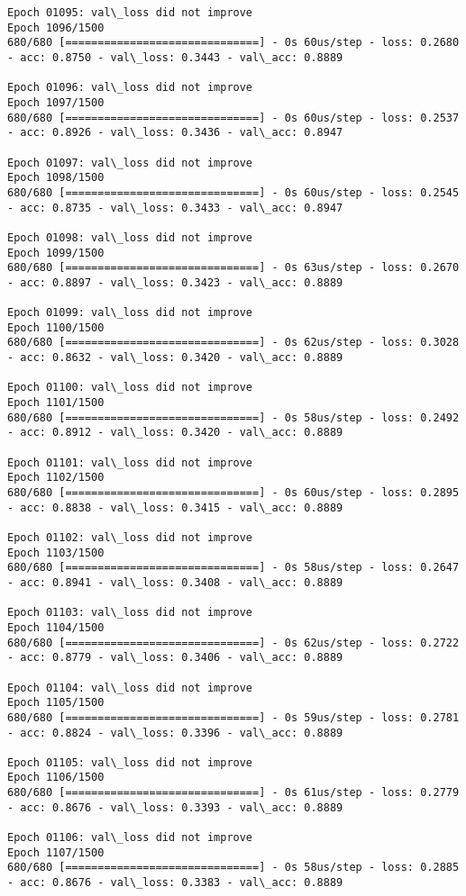 \documentclass[11pt]{article}
\begin{document}
\begin{Verbatim}[commandchars=\\\{\}]
Epoch 01095: val\_loss did not improve
Epoch 1096/1500
680/680 [==============================] - 0s 60us/step - loss: 0.2680 - acc: 0.8750 - val\_loss: 0.3443 - val\_acc: 0.8889

Epoch 01096: val\_loss did not improve
Epoch 1097/1500
680/680 [==============================] - 0s 60us/step - loss: 0.2537 - acc: 0.8926 - val\_loss: 0.3436 - val\_acc: 0.8947

Epoch 01097: val\_loss did not improve
Epoch 1098/1500
680/680 [==============================] - 0s 60us/step - loss: 0.2545 - acc: 0.8735 - val\_loss: 0.3433 - val\_acc: 0.8947

Epoch 01098: val\_loss did not improve
Epoch 1099/1500
680/680 [==============================] - 0s 63us/step - loss: 0.2670 - acc: 0.8897 - val\_loss: 0.3423 - val\_acc: 0.8889

Epoch 01099: val\_loss did not improve
Epoch 1100/1500
680/680 [==============================] - 0s 62us/step - loss: 0.3028 - acc: 0.8632 - val\_loss: 0.3420 - val\_acc: 0.8889

Epoch 01100: val\_loss did not improve
Epoch 1101/1500
680/680 [==============================] - 0s 58us/step - loss: 0.2492 - acc: 0.8912 - val\_loss: 0.3420 - val\_acc: 0.8889

Epoch 01101: val\_loss did not improve
Epoch 1102/1500
680/680 [==============================] - 0s 60us/step - loss: 0.2895 - acc: 0.8838 - val\_loss: 0.3415 - val\_acc: 0.8889

Epoch 01102: val\_loss did not improve
Epoch 1103/1500
680/680 [==============================] - 0s 58us/step - loss: 0.2647 - acc: 0.8941 - val\_loss: 0.3408 - val\_acc: 0.8889

Epoch 01103: val\_loss did not improve
Epoch 1104/1500
680/680 [==============================] - 0s 62us/step - loss: 0.2722 - acc: 0.8779 - val\_loss: 0.3406 - val\_acc: 0.8889

Epoch 01104: val\_loss did not improve
Epoch 1105/1500
680/680 [==============================] - 0s 59us/step - loss: 0.2781 - acc: 0.8824 - val\_loss: 0.3396 - val\_acc: 0.8889

Epoch 01105: val\_loss did not improve
Epoch 1106/1500
680/680 [==============================] - 0s 61us/step - loss: 0.2779 - acc: 0.8676 - val\_loss: 0.3393 - val\_acc: 0.8889

Epoch 01106: val\_loss did not improve
Epoch 1107/1500
680/680 [==============================] - 0s 58us/step - loss: 0.2885 - acc: 0.8676 - val\_loss: 0.3383 - val\_acc: 0.8889


\end{Verbatim}
\end{document}
